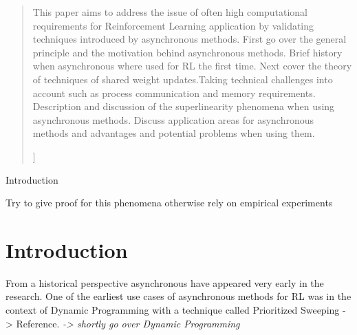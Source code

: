 
    \date{Received: date / Accepted: date}


    \maketitle

    \begin{abstract}
        
        This paper aims to address the issue of often high computational requirements for Reinforcement Learning application by validating techniques introduced by asynchronous methods.
        First go over the general principle and the motivation behind asynchronous methods. Brief history when asynchronous where used for RL the first time. Next cover the theory of techniques of shared weight updates.Taking technical challenges into account such as process communication and memory requirements.  Description and discussion of the superlinearity phenomena when using asynchronous methods. Discuss application areas for asynchronous methods and advantages and potential problems when using them.
        
        ]
    \end{abstract}

Introduction


Try to give proof for this phenomena otherwise rely on empirical experiments





    \section{Introduction}
    \label{intro}
    From a historical perspective asynchronous have appeared very early in the research. One of the earliest use cases of asynchronous methods for RL was in the context of Dynamic Programming with a technique called Prioritized Sweeping -> Reference.
    \textit{-> shortly go over Dynamic Programming}
    
